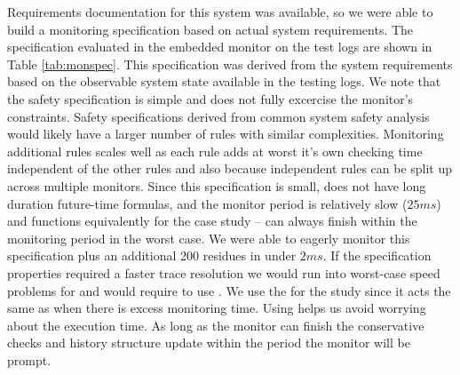 Requirements documentation for this system was available, so we were able to build a monitoring specification based on actual system requirements.
The specification evaluated in the embedded monitor on the test logs are shown in Table \ref{tab:monspec}. This specification was derived from the system requirements based on the observable system state available in the testing logs.
We note that the safety specification is simple and does not fully excercise the monitor's constraints. Safety specifications derived from common system safety analysis would likely have a larger number of rules with similar complexities.
Monitoring additional rules scales well as each rule adds at worst it's own checking time independent of the other rules and
also because independent rules can be split up across multiple monitors.
%
Since this specification is small, does not have long duration future-time formulas,
and the monitor period is relatively slow ($25ms$) \ha and \monitor functions equivalently
for the case study -- \monitor can always finish within the monitoring period in the worst case.
We were able to eagerly monitor this specification plus an additional 200 residues in under $2ms$.
If the specification properties required a faster trace resolution we would run into
worst-case speed problems for \monitor and would require to use \ha.
%
We use the \ha for the study since it acts the same as \monitor when there is excess monitoring time.
Using \ha helps us avoid worrying about the execution time.
As long as the monitor can finish the conservative checks and
history structure update within the period the monitor will be prompt.



